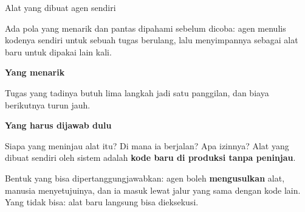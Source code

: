 \documentclass[aspectratio=169,11pt,t]{beamer}
\begin{document}
\begin{frame}[shrink=25]{Alat yang dibuat agen sendiri}
{\fontsize{9.4}{12.6}\selectfont\color{fg2}Ada pola yang menarik dan pantas dipahami sebelum dicoba: agen menulis kodenya sendiri untuk sebuah tugas berulang, lalu menyimpannya sebagai alat baru untuk dipakai lain kali.\par}\vskip 4pt
\begin{minipage}[t]{0.485\textwidth}
{\fontsize{9.4}{12.6}\selectfont\color{fg2}\textbf{Yang menarik}\par}\vskip 4pt
{\fontsize{9.4}{12.6}\selectfont\color{fg2}Tugas yang tadinya butuh lima langkah jadi satu panggilan, dan biaya berikutnya turun jauh.\par}\vskip 4pt

\end{minipage}%
\hfill
\begin{minipage}[t]{0.485\textwidth}
{\fontsize{9.4}{12.6}\selectfont\color{fg2}\textbf{Yang harus dijawab dulu}\par}\vskip 4pt
{\fontsize{9.4}{12.6}\selectfont\color{fg2}Siapa yang meninjau alat itu? Di mana ia berjalan? Apa izinnya? Alat yang dibuat sendiri oleh sistem adalah \textbf{kode baru di produksi tanpa peninjau}.\par}\vskip 4pt

\end{minipage}%
\begin{iband}[signal]
Bentuk yang bisa dipertanggungjawabkan: agen boleh \textbf{mengusulkan} alat, manusia menyetujuinya, dan ia masuk lewat jalur yang sama dengan kode lain. Yang tidak bisa: alat baru langsung bisa dieksekusi.
\end{iband}
\end{frame}
\end{document}

